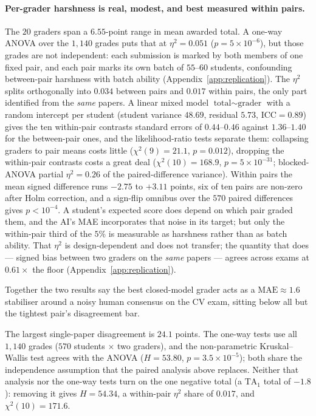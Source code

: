 \paragraph{Per-grader harshness is real, modest, and best measured within pairs.}
\label{sec:groundtruth:perta}
The $20$ graders span a $6.55$-point range in mean awarded total. A one-way ANOVA over the $1{,}140$ grades puts that at $\eta^2 = 0.051$ ($p = 5\times10^{-6}$), but those grades are not independent: each submission is marked by both members of one fixed pair, and each pair marks its own batch of $55$--$60$ students, confounding between-pair harshness with batch ability (Appendix~\ref{app:replication}). The $\eta^2$ splits orthogonally into $0.034$ between pairs and $0.017$ within pairs, the only part identified from the \emph{same} papers. A linear mixed model $\text{total} \sim \text{grader}$ with a random intercept per student (student variance $48.69$, residual $5.73$, $\mathrm{ICC} = 0.89$) gives the ten within-pair contrasts standard errors of $0.44$--$0.46$ against $1.36$--$1.40$ for the between-pair ones, and the likelihood-ratio tests separate them: collapsing graders to pair means costs little ($\chi^2(9) = 21.1$, $p = 0.012$), dropping the within-pair contrasts costs a great deal ($\chi^2(10) = 168.9$, $p = 5\times10^{-31}$; blocked-ANOVA partial $\eta^2 = 0.26$ of the paired-difference variance). Within pairs the mean signed difference runs $-2.75$ to $+3.11$ points, six of ten pairs are non-zero after Holm correction, and a sign-flip omnibus over the $570$ paired differences gives $p < 10^{-4}$. A student's expected score does depend on which pair graded them, and the AI's MAE incorporates that noise in its target; but only the within-pair third of the $5\%$ is measurable as harshness rather than as batch ability. That $\eta^2$ is design-dependent and does not transfer; the quantity that does --- signed bias between two graders on the \emph{same} papers --- agrees across exams at $0.61\times$ the floor (Appendix~\ref{app:replication}).

Together the two results say the best closed-model grader acts as a $\text{MAE} \approx 1.6$ stabiliser around a noisy human consensus on the CV exam, sitting below all but the tightest pair's disagreement bar.

The largest single-paper disagreement is $24.1$ points. The one-way tests use all $1{,}140$ grades ($570$ students $\times$ two graders), and the non-parametric Kruskal--Wallis test agrees with the ANOVA ($H = 53.80$, $p = 3.5\times10^{-5}$); both share the independence assumption that the paired analysis above replaces. Neither that analysis nor the one-way tests turn on the one negative total (a $\mathrm{TA}_1$ total of $-1.8$): removing it gives $H = 54.34$, a within-pair $\eta^2$ share of $0.017$, and $\chi^2(10) = 171.6$.

